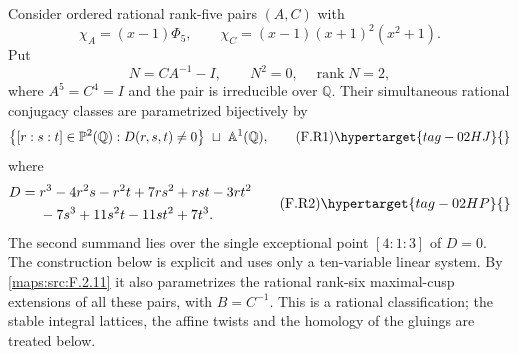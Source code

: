\begin{theorem}\hypertarget{tag-02NA}{}\label{maps:src:F.2.20}


Consider ordered rational rank-five pairs $(A,C)$ with
\[
 \chi_A=(x-1)\Phi_5,
 \qquad \chi_C=(x-1)(x+1)^2(x^2+1).
\]
Put
\[
 N=CA^{-1}-I,
 \qquad N^2=0,\quad\operatorname{rank}N=2,
\]
where $A^5=C^4=I$ and the pair is irreducible over $\mathbb Q$.
Their simultaneous rational conjugacy classes are parametrized
bijectively by
\[
 \bigl\{[r:s:t]\in\mathbb P^2(\mathbb Q):D(r,s,t)\ne0\bigr\}
 \ \sqcup\ \mathbb A^1(\mathbb Q),
 \tag{F.R1}\hypertarget{tag-02HJ}{}\label{maps:eq:F.R1}
\]
where
\[
\begin{split}
 D={}&r^3-4r^2s-r^2t+7rs^2+rst-3rt^2\\
     &{}-7s^3+11s^2t-11st^2+7t^3.
\end{split}
 \tag{F.R2}\hypertarget{tag-02HP}{}\label{maps:eq:F.R2}
\]
The second summand lies over the single exceptional point
$[4:1:3]$ of $D=0$.  The construction below is explicit and
uses only a ten-variable linear system.  By \ref{maps:src:F.2.11} it also
parametrizes the rational rank-six maximal-cusp extensions
of all these pairs, with $B=C^{-1}$.
This is a rational classification; the stable integral lattices, the affine twists and the homology of the gluings are treated below.

\end{theorem}


